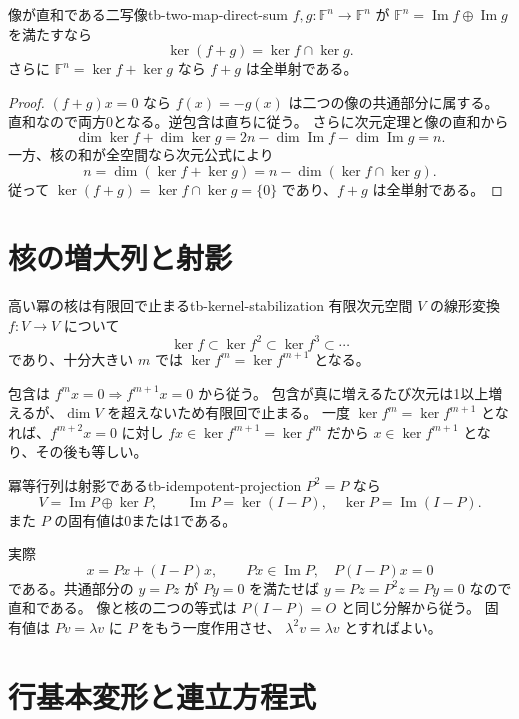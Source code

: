 \begin{proposition}{像が直和である二写像}{tb-two-map-direct-sum}
$f,g:\mathbb F^n\to\mathbb F^n$ が
$\mathbb F^n=\operatorname{Im}f\oplus\operatorname{Im}g$ を満たすなら
\[
\ker(f+g)=\ker f\cap\ker g.
\]
さらに $\mathbb F^n=\ker f+\ker g$ なら $f+g$ は全単射である。
\end{proposition}

\begin{proof}
$(f+g)x=0$ なら $f(x)=-g(x)$ は二つの像の共通部分に属する。
直和なので両方0となる。逆包含は直ちに従う。
さらに次元定理と像の直和から
\[
\dim\ker f+\dim\ker g
=2n-\dim\operatorname{Im}f-\dim\operatorname{Im}g=n.
\]
一方、核の和が全空間なら次元公式により
\[
n=\dim(\ker f+\ker g)
=n-\dim(\ker f\cap\ker g).
\]
従って $\ker(f+g)=\ker f\cap\ker g=\{0\}$ であり、$f+g$ は全単射である。
\end{proof}

\section{核の増大列と射影}

\begin{proposition}{高い冪の核は有限回で止まる}{tb-kernel-stabilization}
有限次元空間 $V$ の線形変換 $f:V\to V$ について
\[
\ker f\subset\ker f^2\subset\ker f^3\subset\cdots
\]
であり、十分大きい $m$ では $\ker f^m=\ker f^{m+1}$ となる。
\end{proposition}

包含は $f^mx=0\Rightarrow f^{m+1}x=0$ から従う。
包含が真に増えるたび次元は1以上増えるが、$\dim V$ を超えないため有限回で止まる。
一度 $\ker f^m=\ker f^{m+1}$ となれば、$f^{m+2}x=0$ に対し
$fx\in\ker f^{m+1}=\ker f^m$ だから $x\in\ker f^{m+1}$ となり、その後も等しい。

\begin{proposition}{冪等行列は射影である}{tb-idempotent-projection}
$P^2=P$ なら
\[
\boxed{V=\operatorname{Im}P\oplus\ker P},
\qquad
\operatorname{Im}P=\ker(I-P),\quad
\ker P=\operatorname{Im}(I-P).
\]
また $P$ の固有値は0または1である。
\end{proposition}

実際
\[
x=Px+(I-P)x,\qquad Px\in\operatorname{Im}P,\quad
P(I-P)x=0
\]
である。共通部分の $y=Pz$ が $Py=0$ を満たせば
$y=Pz=P^2z=Py=0$ なので直和である。
像と核の二つの等式は $P(I-P)=O$ と同じ分解から従う。
固有値は $Pv=\lambda v$ に $P$ をもう一度作用させ、
$\lambda^2v=\lambda v$ とすればよい。

\section{行基本変形と連立方程式}

